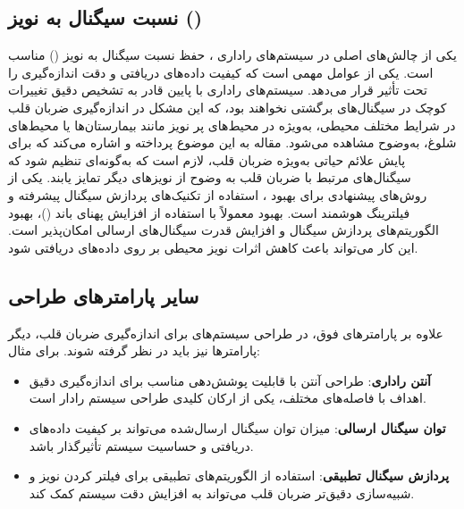 \subsection{نسبت سیگنال به نویز ()} %
\label{sec:snr}

یکی از چالش‌های اصلی در سیستم‌های راداری ، حفظ نسبت سیگنال به نویز () مناسب است.  یکی از عوامل مهمی است که کیفیت داده‌های دریافتی و دقت اندازه‌گیری را تحت تأثیر قرار می‌دهد. سیستم‌های راداری با  پایین قادر به تشخیص دقیق تغییرات کوچک در سیگنال‌های برگشتی نخواهند بود، که این مشکل در اندازه‌گیری ضربان قلب در شرایط مختلف محیطی، به‌ویژه در محیط‌های پر نویز مانند بیمارستان‌ها یا محیط‌های شلوغ، به‌وضوح مشاهده می‌شود.
مقاله \cite{islam2020non} به این موضوع پرداخته و اشاره می‌کند که برای پایش علائم حیاتی به‌ویژه ضربان قلب، لازم است که  به‌گونه‌ای تنظیم شود که سیگنال‌های مرتبط با ضربان قلب به وضوح از نویزهای دیگر تمایز یابند. یکی از روش‌های پیشنهادی برای بهبود ، استفاده از تکنیک‌های پردازش سیگنال پیشرفته و فیلترینگ هوشمند است.
بهبود  معمولاً با استفاده از افزایش پهنای باند ()، بهبود الگوریتم‌های پردازش سیگنال و افزایش قدرت سیگنال‌های ارسالی امکان‌پذیر است. این کار می‌تواند باعث کاهش اثرات نویز محیطی بر روی داده‌های دریافتی شود.

\subsection{سایر پارامترهای طراحی} %
\label{sec:other-design-parameters}

علاوه بر پارامترهای فوق، در طراحی سیستم‌های  برای اندازه‌گیری ضربان قلب، دیگر پارامترها نیز باید در نظر گرفته شوند. برای مثال:
\begin{itemize}
    \item \textbf{آنتن راداری}: طراحی آنتن با قابلیت پوشش‌دهی مناسب برای اندازه‌گیری دقیق اهداف با فاصله‌های مختلف، یکی از ارکان کلیدی طراحی سیستم رادار  است.
    \item \textbf{توان سیگنال ارسالی}: میزان توان سیگنال ارسال‌شده می‌تواند بر کیفیت داده‌های دریافتی و حساسیت سیستم تأثیرگذار باشد.
    \item \textbf{پردازش سیگنال تطبیقی}: استفاده از الگوریتم‌های تطبیقی برای فیلتر کردن نویز و شبیه‌سازی دقیق‌تر ضربان قلب می‌تواند به افزایش دقت سیستم کمک کند.
\end{itemize}


